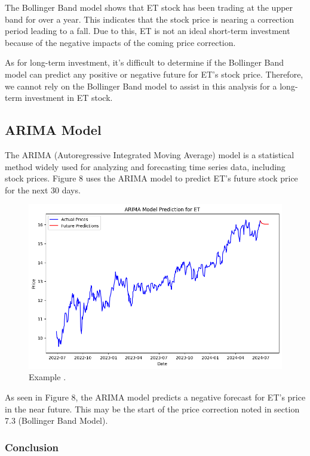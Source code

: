 \documentclass[9pt,a4paper,twoside]{tau}
\begin{document}
            The Bollinger Band model shows that ET stock has been trading at the upper band for over a year. This indicates that the stock price is nearing a correction period leading to a fall. Due to this, ET is not an ideal short-term investment because of the negative impacts of the coming price correction.

            As for long-term investment, it's difficult to determine if the Bollinger Band model can predict any positive or negative future for ET's stock price. Therefore, we cannot rely on the Bollinger Band model to assist in this analysis for a long-term investment in ET stock.

    \subsection{ARIMA Model}
    
        The ARIMA (Autoregressive Integrated Moving Average) model is a statistical method widely used for analyzing and forecasting time series data, including stock prices. Figure 8 uses the ARIMA model to predict ET's future stock price for the next 30 days. 
        
        \begin{figure}[H]
            \centering
            \includegraphics[width=0.85\columnwidth]{Figures/ARIMA_ModelPredictionET.png}
            \caption{Example \cite{yahoo-finance-2024}.}
            \label{fig:figure}
        \end{figure}

        As seen in Figure 8, the ARIMA model predicts a negative forecast for ET's price in the near future. This may be the start of the price correction noted in section 7.3 (Bollinger Band Model).

            \subsubsection{Conclusion}
\end{document}
